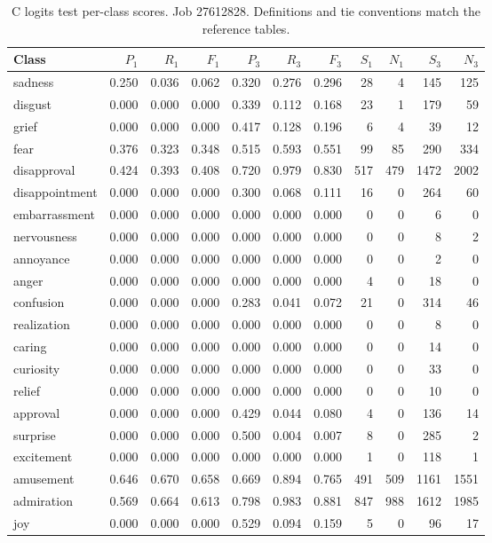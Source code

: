 \begin{table}[!htbp]
\centering
\scriptsize
\setlength{\tabcolsep}{5pt}
\begin{tabular}{lrrrrrrrrrr}
\toprule
Class & $P_1$ & $R_1$ & $F_1$ & $P_3$ & $R_3$ & $F_3$ & $S_1$ & $N_1$ & $S_3$ & $N_3$ \\
\midrule
sadness & 0.250 & 0.036 & 0.062 & 0.320 & 0.276 & 0.296 & 28 & 4 & 145 & 125 \\
disgust & 0.000 & 0.000 & 0.000 & 0.339 & 0.112 & 0.168 & 23 & 1 & 179 & 59 \\
grief & 0.000 & 0.000 & 0.000 & 0.417 & 0.128 & 0.196 & 6 & 4 & 39 & 12 \\
fear & 0.376 & 0.323 & 0.348 & 0.515 & 0.593 & 0.551 & 99 & 85 & 290 & 334 \\
disapproval & 0.424 & 0.393 & 0.408 & 0.720 & 0.979 & 0.830 & 517 & 479 & 1472 & 2002 \\
disappointment & 0.000 & 0.000 & 0.000 & 0.300 & 0.068 & 0.111 & 16 & 0 & 264 & 60 \\
embarrassment & 0.000 & 0.000 & 0.000 & 0.000 & 0.000 & 0.000 & 0 & 0 & 6 & 0 \\
nervousness & 0.000 & 0.000 & 0.000 & 0.000 & 0.000 & 0.000 & 0 & 0 & 8 & 2 \\
annoyance & 0.000 & 0.000 & 0.000 & 0.000 & 0.000 & 0.000 & 0 & 0 & 2 & 0 \\
anger & 0.000 & 0.000 & 0.000 & 0.000 & 0.000 & 0.000 & 4 & 0 & 18 & 0 \\
confusion & 0.000 & 0.000 & 0.000 & 0.283 & 0.041 & 0.072 & 21 & 0 & 314 & 46 \\
realization & 0.000 & 0.000 & 0.000 & 0.000 & 0.000 & 0.000 & 0 & 0 & 8 & 0 \\
caring & 0.000 & 0.000 & 0.000 & 0.000 & 0.000 & 0.000 & 0 & 0 & 14 & 0 \\
curiosity & 0.000 & 0.000 & 0.000 & 0.000 & 0.000 & 0.000 & 0 & 0 & 33 & 0 \\
relief & 0.000 & 0.000 & 0.000 & 0.000 & 0.000 & 0.000 & 0 & 0 & 10 & 0 \\
approval & 0.000 & 0.000 & 0.000 & 0.429 & 0.044 & 0.080 & 4 & 0 & 136 & 14 \\
surprise & 0.000 & 0.000 & 0.000 & 0.500 & 0.004 & 0.007 & 8 & 0 & 285 & 2 \\
excitement & 0.000 & 0.000 & 0.000 & 0.000 & 0.000 & 0.000 & 1 & 0 & 118 & 1 \\
amusement & 0.646 & 0.670 & 0.658 & 0.669 & 0.894 & 0.765 & 491 & 509 & 1161 & 1551 \\
admiration & 0.569 & 0.664 & 0.613 & 0.798 & 0.983 & 0.881 & 847 & 988 & 1612 & 1985 \\
joy & 0.000 & 0.000 & 0.000 & 0.529 & 0.094 & 0.159 & 5 & 0 & 96 & 17 \\
\bottomrule
\end{tabular}
\caption{C logits test per-class scores. Job 27612828. Definitions and tie conventions match the reference tables.}
\label{tab:classes-c_emotion_logits}
\end{table}
